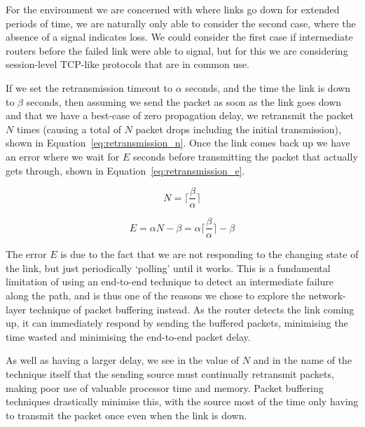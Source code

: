 \documentclass[withindex,glossary,openany]{cam-thesis}
\begin{document}
For the environment we are concerned with where links go down for extended periods of time, we are naturally only able to consider the second case, where the absence of a signal indicates loss. We could consider the first case if intermediate routers before the failed link were able to signal, but for this we are considering session-level TCP-like protocols that are in common use.

If we set the retransmission timeout to $\alpha$ seconds, and the time the link is down to $\beta$ seconds, then assuming we send the packet as soon as the link goes down and that we have a best-case of zero propagation delay, we retransmit the packet $N$ times (causing a total of $N$ packet drops including the initial transmission), shown in Equation~\ref{eq:retransmission_n}. Once the link comes back up we have an error where we wait for $E$ seconds before transmitting the packet that actually gets through, shown in Equation~\ref{eq:retransmission_e}.

\begin{minipage}{0.35\textwidth}
\begin{equation} \label{eq:retransmission_n}
N = \Big\lceil\frac{\beta}{\alpha}\Big\rceil
\end{equation}
\end{minipage}%
\begin{minipage}{0.65\textwidth}
\begin{equation} \label{eq:retransmission_e}
E = \alpha N - \beta = \alpha \Big\lceil\frac{\beta}{\alpha}\Big\rceil - \beta
\end{equation}
\end{minipage}

The error $E$ is due to the fact that we are not responding to the changing state of the link, but just periodically `polling' until it works. This is a fundamental limitation of using an end-to-end technique to detect an intermediate failure along the path, and is thus one of the reasons we chose to explore the network-layer technique of packet buffering instead. As the router detects the link coming up, it can immediately respond by sending the buffered packets, minimising the time wasted and minimising the end-to-end packet delay.

As well as having a larger delay, we see in the value of $N$ and in the name of the technique itself that the sending source must continually retransmit packets, making poor use of valuable processor time and memory. Packet buffering techniques drastically minimise this, with the source most of the time only having to transmit the packet once even when the link is down.
\end{document}
